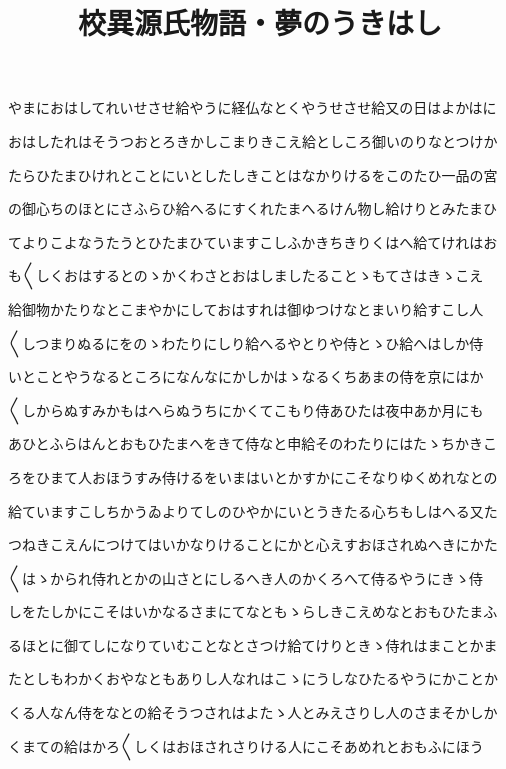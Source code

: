 \documentclass[a4paper,11pt,landscape]{ltjtarticle}
\title{校異源氏物語・夢のうきはし}
\date{}
\begin{document}
\maketitle

やまにおはしてれいせさせ給やうに経仏なとくやうせさせ給又の日はよかはに
\par\medskip
おはしたれはそうつおとろきかしこまりきこえ給としころ御いのりなとつけか
\par\medskip
たらひたまひけれとことにいとしたしきことはなかりけるをこのたひ一品の宮
\par\medskip
の御心ちのほとにさふらひ給へるにすくれたまへるけん物し給けりとみたまひ
\par\medskip
てよりこよなうたうとひたまひていますこしふかきちきりくはへ給てけれはお
\par\medskip
も〱しくおはするとのゝかくわさとおはしましたることゝもてさはきゝこえ
\par\medskip
給御物かたりなとこまやかにしておはすれは御ゆつけなとまいり給すこし人
\par\medskip
〱しつまりぬるにをのゝわたりにしり給へるやとりや侍とゝひ給へはしか侍
\par\medskip
いとことやうなるところになんなにかしかはゝなるくちあまの侍を京にはか
\par\medskip
〱しからぬすみかもはへらぬうちにかくてこもり侍あひたは夜中あか月にも
\par\medskip
あひとふらはんとおもひたまへをきて侍なと申給そのわたりにはたゝちかきこ
\par\medskip
ろをひまて人おほうすみ侍けるをいまはいとかすかにこそなりゆくめれなとの
\par\medskip
給ていますこしちかうゐよりてしのひやかにいとうきたる心ちもしはへる又た
\par\medskip
つねきこえんにつけてはいかなりけることにかと心えすおほされぬへきにかた
\par\medskip
〱はゝかられ侍れとかの山さとにしるへき人のかくろへて侍るやうにきゝ侍
\par\medskip
しをたしかにこそはいかなるさまにてなともゝらしきこえめなとおもひたまふ
\par\medskip
るほとに御てしになりていむことなとさつけ給てけりときゝ侍れはまことかま
\par\medskip
たとしもわかくおやなともありし人なれはこゝにうしなひたるやうにかことか
\par\medskip
くる人なん侍をなとの給そうつされはよたゝ人とみえさりし人のさまそかしか
\par\medskip
くまての給はかろ〱しくはおほされさりける人にこそあめれとおもふにほう
\end{document}
